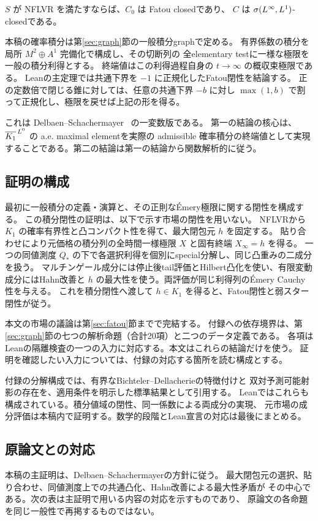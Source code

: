 \begin{theorem}
\label{thm:main}
$S$ が NFLVR を満たすならば、$C_0$ は Fatou closedであり、
$C$ は $\sigma(L^\infty,L^1)$-closedである。
\end{theorem}

本稿の確率積分は第\ref{sec:graph}節の一般積分graphで定める。
有界係数の積分を局所 $M^2\oplus A^1$ 完備化で構成し、その切断列の
全elementary testに一様な極限を一般の積分利得とする。
終端値はこの利得過程自身の $t\to\infty$ の概収束極限である。
Leanの主定理では共通下界を $-1$ に正規化したFatou閉性を結論する。
正の定数倍で閉じる錐に対しては、任意の共通下界 $-b$ に対し
$\max(1,b)$ で割って正規化し、極限を戻せば上記の形を得る。

これは Delbaen--Schachermayer~\cite[Theorem~4.2]{DS} の一変数版である。
第一の結論の核心は、$\overline{K_1}^{\,L^0}$ の a.e. maximal elementを実際の admissible
確率積分の終端値として実現することである。第二の結論は第一の結論から関数解析的に従う。

\subsection{証明の構成}
最初に一般積分の定義・演算と、その正則なÉmery極限に関する閉性を構成する。
この積分閉性の証明は、以下で示す市場の閉性を用いない。
NFLVRから $K_1$ の確率有界性と凸コンパクト性を得て、最大閉包元 $h$ を固定する。
貼り合わせにより元価格の積分列の全時間一様極限 $X$ と固有終端 $X_\infty=h$ を得る。
一つの同値測度 $Q_*$ の下で各選択利得を個別にspecial分解し、同じ凸重みの二成分を扱う。
マルチンゲール成分には停止後tail評価とHilbert凸化を使い、有限変動成分にはHahn改善と
$h$ の最大性を使う。両評価が同じ利得列のÉmery Cauchy性を与える。
これを積分閉性へ渡して $h\in K_1$ を得ると、Fatou閉性と弱スター閉性が従う。

本文の市場の議論は第\ref{sec:fatou}節までで完結する。
付録への依存境界は、第\ref{sec:graph}節の七つの解析命題（合計20項）と二つのデータ定義である。
各項はLeanの隔離検査の一つの入力に対応する。本文はこれらの結論だけを使う。
証明を確認したい入力については、付録の対応する箇所を読む構成とする。

付録の分解構成では、有界なBichteler--Dellacherieの特徴付けと
双対予測可能射影の存在を、適用条件を明示した標準結果として引用する。
Leanではこれらも構成されている。積分値域の閉性、同一係数による両成分の実現、
元市場の成分評価は本稿内で証明する。数学的段階とLean宣言の対応は最後にまとめる。

\subsection{原論文との対応}
\label{sec:original-proof}
本稿の主証明は、Delbaen--Schachermayer\cite[Section 4]{DS}の方針に従う。
最大閉包元の選択、貼り合わせ、同値測度上での共通凸化、Hahn改善による最大性矛盾が
その中心である。次の表は主証明で用いる内容の対応を示すものであり、
原論文の各命題を同じ一般性で再掲するものではない。

